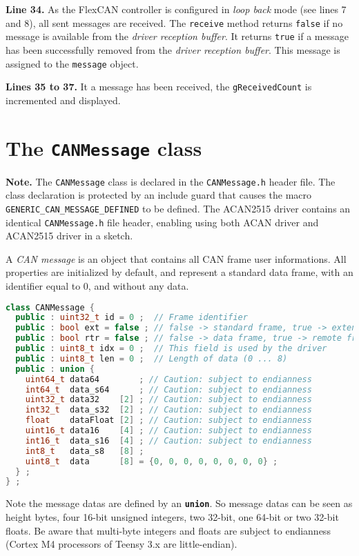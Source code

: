 \documentclass[10pt, a4paper, obeyspaces, openany]{extarticle}
\newcommand \sectionLabel[2]{\section{#1}\label{sec:#2}}
\begin{document}
{\bf Line 34.} As the FlexCAN controller is configured in \emph{loop back} mode (see lines 7 and 8), all sent messages are received. The \texttt{receive} method returns \texttt{false} if no message is available from the \emph{driver reception buffer}. It returns \texttt{true} if a message has been successfully removed from the \emph{driver reception buffer}. This message is assigned to the \texttt{message} object.

{\bf Lines 35 to 37.} It a message has been received, the \texttt{gReceivedCount} is incremented and displayed.





\sectionLabel{The \texttt{CANMessage} class}{CANMessageClass}

{\bf Note. } The \texttt{CANMessage} class is declared in the \texttt{CANMessage.h} header file. The class declaration is protected by an include guard that causes the macro \texttt{GENERIC\_CAN\_MESSAGE\_DEFINED} to be defined. The ACAN2515 driver contains an identical \texttt{CANMessage.h} file header, enabling using both ACAN driver and ACAN2515 driver in a sketch.

A \emph{CAN message} is an object that contains all CAN frame user informations. All properties are initialized by default, and represent a standard data frame, with an identifier equal to $0$, and without any data.

{ \small\begin{lstlisting}[language=c++]
class CANMessage {
  public : uint32_t id = 0 ;  // Frame identifier
  public : bool ext = false ; // false -> standard frame, true -> extended frame
  public : bool rtr = false ; // false -> data frame, true -> remote frame
  public : uint8_t idx = 0 ;  // This field is used by the driver
  public : uint8_t len = 0 ;  // Length of data (0 ... 8)
  public : union {
    uint64_t data64        ; // Caution: subject to endianness
    int64_t  data_s64      ; // Caution: subject to endianness
    uint32_t data32    [2] ; // Caution: subject to endianness
    int32_t  data_s32  [2] ; // Caution: subject to endianness
    float    dataFloat [2] ; // Caution: subject to endianness
    uint16_t data16    [4] ; // Caution: subject to endianness
    int16_t  data_s16  [4] ; // Caution: subject to endianness
    int8_t   data_s8   [8] ;
    uint8_t  data      [8] = {0, 0, 0, 0, 0, 0, 0, 0} ;
  } ;
} ;
\end{lstlisting}}

Note the message datas are defined by an {\bf\texttt{union}}. So message datas can be seen as height bytes, four 16-bit unsigned integers, two 32-bit, one 64-bit or two 32-bit floats. Be aware that multi-byte integers and floats are subject to endianness (Cortex M4 processors of Teensy 3.x are little-endian).
\end{document}
